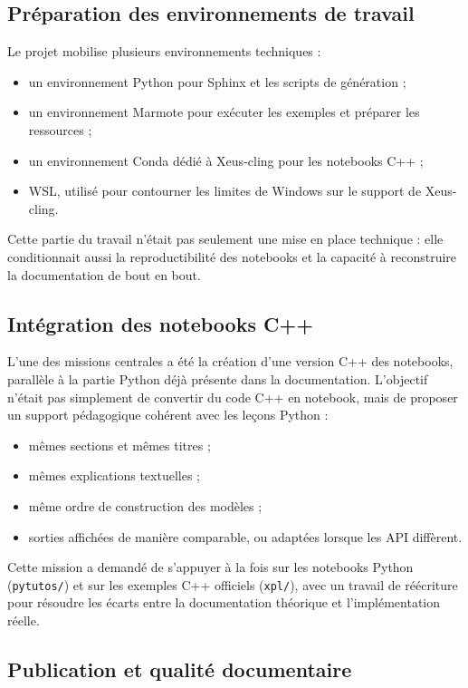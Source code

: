 \documentclass[a4paper,12pt,twoside]{article}
\begin{document}
\subsection{Préparation des environnements de travail}

Le projet mobilise plusieurs environnements techniques :
\begin{itemize}
    \item un environnement Python pour Sphinx et les scripts de génération ;
    \item un environnement Marmote pour exécuter les exemples et préparer les ressources ;
    \item un environnement Conda dédié à Xeus-cling pour les notebooks C++ ;
    \item WSL, utilisé pour contourner les limites de Windows sur le support de Xeus-cling.
\end{itemize}

Cette partie du travail n'était pas seulement une mise en place technique : elle conditionnait aussi la reproductibilité des notebooks et la capacité à reconstruire la documentation de bout en bout.

\subsection{Intégration des notebooks C++}

L'une des missions centrales a été la création d'une version C++ des notebooks, parallèle à la partie Python déjà présente dans la documentation. L'objectif n'était pas simplement de convertir du code C++ en notebook, mais de proposer un support pédagogique cohérent avec les leçons Python :
\begin{itemize}
    \item mêmes sections et mêmes titres ;
    \item mêmes explications textuelles ;
    \item même ordre de construction des modèles ;
    \item sorties affichées de manière comparable, ou adaptées lorsque les API diffèrent.
\end{itemize}

Cette mission a demandé de s'appuyer à la fois sur les notebooks Python (\texttt{pytutos/}) et sur les exemples C++ officiels (\texttt{xpl/}), avec un travail de réécriture pour résoudre les écarts entre la documentation théorique et l'implémentation réelle.

\subsection{Publication et qualité documentaire}
\end{document}
